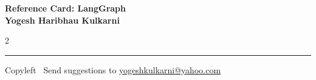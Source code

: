 \documentclass[8pt,landscape]{article}
\begin{document}
\footnotesize


\begin{center}
\Large{\textbf{Reference Card: LangGraph\\ Yogesh Haribhau Kulkarni}}
\end{center}

\begin{multicols}{2}

\end{multicols}

\rule{\linewidth}{0.25pt}
\scriptsize
Copyleft \textcopyleft\  Send suggestions to
\href{http://www.yogeshkulkarni.com}{yogeshkulkarni@yahoo.com}
\end{document}
